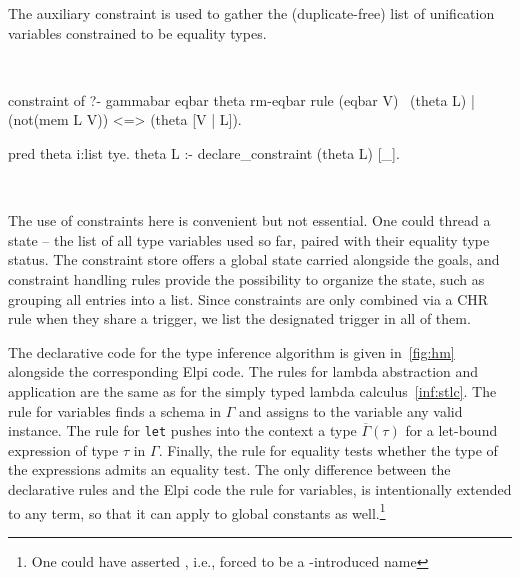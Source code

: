 \documentclass[a4paper, 11pt]{book}
\newenvironment{elpicode}
  {\VerbatimEnvironment~\\\begin{elpibox}\begin{xelpicode}}{\end{xelpicode}
\end{elpibox}\\}
\begin{document}
\noindent
The auxiliary constraint  is used to gather the (duplicate-free)
list of unification variables constrained to be equality types.

\begin{elpicode}
constraint of ?- gammabar eqbar theta rm-eqbar {
  rule (eqbar V) \ (theta L) | (not(mem L V)) <=> (theta [V | L]).
}

pred theta i:list tye.
theta L :- declare_constraint (theta L) [_].
\end{elpicode}

The use of constraints here is convenient but not essential. One could thread
a state -- the list of all type variables used so far, paired with their
equality type status. The constraint store offers a global state carried
alongside the goals, and constraint handling rules provide the possibility to
organize the state, such as grouping all entries into a list. Since
constraints are only combined via a CHR rule when they share a trigger,
we list the designated trigger \elpi{_} in all of them.

The declarative code for the type inference algorithm is given
in~\cref{fig:hm} alongside the corresponding Elpi code.
 The
rules for lambda abstraction and application are the same as for the simply
typed lambda calculus~\cref{inf:stlc}. The rule for variables finds a schema
in $\Gamma$ and assigns to the variable any valid instance. The rule for
\texttt{let} pushes into the context a type $\overline{\Gamma}(\tau)$ for a
let-bound expression of type $\tau$ in $\Gamma$. Finally, the rule for
equality tests whether the type of the expressions admits an equality test.
The only difference between the declarative rules and the Elpi code
the rule for variables,
is intentionally extended to any term, so that it can apply to global
constants as well.\footnote{One could have asserted , i.e.,
forced  to be a -introduced name}
\end{document}
